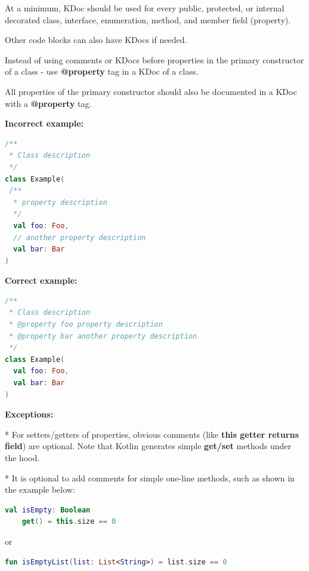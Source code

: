 {{{{{{{{{{{{{{{{\label{sec:2.1.1}



At a minimum, KDoc should be used for every public, protected, or internal decorated class, interface, enumeration, method, and member field (property).

Other code blocks can also have KDocs if needed.

Instead of using comments or KDocs before properties in the primary constructor of a class - use \textbf{@property} tag in a KDoc of a class.

All properties of the primary constructor should also be documented in a KDoc with a \textbf{@property} tag.





\textbf{Incorrect example:}

\begin{lstlisting}[language=Kotlin]
/**
 * Class description
 */
class Example(
 /**
  * property description
  */
  val foo: Foo,
  // another property description
  val bar: Bar
)
\end{lstlisting}


\textbf{Correct example:}

\begin{lstlisting}[language=Kotlin]
/**
 * Class description
 * @property foo property description
 * @property bar another property description
 */
class Example(
  val foo: Foo,
  val bar: Bar
)
\end{lstlisting}


\textbf{Exceptions:}



* For setters/getters of properties, obvious comments (like \textbf{this getter returns field}) are optional. Note that Kotlin generates simple \textbf{get/set} methods under the hood.

   

* It is optional to add comments for simple one-line methods, such as shown in the example below:

\begin{lstlisting}[language=Kotlin]
val isEmpty: Boolean
    get() = this.size == 0
\end{lstlisting}


or



\begin{lstlisting}[language=Kotlin]
fun isEmptyList(list: List<String>) = list.size == 0
\end{lstlisting}


}}}}}}}}}}}}}}}}
